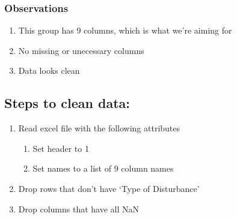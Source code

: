 \documentclass[11pt]{article}
\providecommand{\tightlist}{%
      \setlength{\itemsep}{0pt}\setlength{\parskip}{0pt}}
\begin{document}
    \subsubsection{Observations}\label{observations}

\begin{enumerate}
\def\labelenumi{\arabic{enumi}.}
\tightlist
\item
  This group has 9 columns, which is what we're aiming for
\item
  No missing or unecessary columns
\item
  Data looks clean
\end{enumerate}

    \subsection{Steps to clean data:}\label{steps-to-clean-data}

\begin{enumerate}
\def\labelenumi{\arabic{enumi}.}
\tightlist
\item
  Read excel file with the following attributes

  \begin{enumerate}
  \def\labelenumii{\arabic{enumii}.}
  \tightlist
  \item
    Set header to 1\\
  \item
    Set names to a list of 9 column names\\
  \end{enumerate}
\item
  Drop rows that don't have `Type of Disturbance'
\item
  Drop columns that have all NaN
\end{enumerate}
\end{document}
